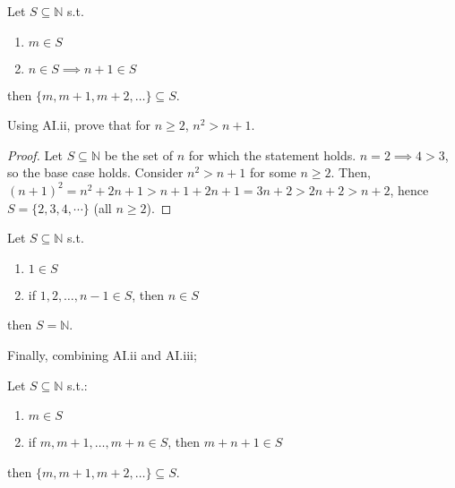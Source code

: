 \documentclass[12pt]{article}
\begin{document}
\begin{axiom}[AI.ii]
  Let $S \subseteq \mathbb{N}$ s.t.
  \begin{enumerate}[label=(\alph*)]
    \item $m \in S$
    \item $n \in S \implies n+1 \in S$
  \end{enumerate}
  then $\{m, m+1, m+2, \dots\} \subseteq S$.
\end{axiom}

\begin{example}
  Using AI.ii, prove that for $n \geq 2$, $n^2 > n+1$.

  \begin{proof}
    Let $S \subseteq \mathbb{N}$ be the set of $n$ for which the statement holds. $n = 2 \implies 4 > 3$, so the base case holds. Consider $n^2 > n +1$ for some $n \geq 2$. Then, $(n+1)^2 = n^2 + 2n + 1 > n+1 + 2n + 1 = 3n + 2 > 2n + 2 > n + 2$, hence $S = \{2,3,4, \cdots \}$ (all $n \geq 2$).
  \end{proof}  
\end{example}

\begin{axiom}\label{axiom:inductioniii}
  Let $S \subseteq \mathbb{N}$ s.t.
  \begin{enumerate}[label=(\alph*)]
    \item $1 \in S$
    \item if $1, 2, \dots, n -1 \in S$, then $n \in S$
  \end{enumerate}
  then $S = \mathbb{N}$.
\end{axiom}

Finally, combining AI.ii and AI.iii;
\begin{axiom}[AI.iv]
  Let $S \subseteq \mathbb{N}$ s.t.:
  \begin{enumerate}[label=(\alph*)]
    \item $m \in S$
    \item if $m, m + 1, \dots, m + n \in S$, then $m + n + 1 \in S$
  \end{enumerate}
  then $\{m, m+1, m+2, \dots\} \subseteq S$.
\end{axiom}
\end{document}
